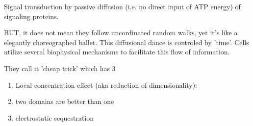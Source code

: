 \begin{mdframed}
Signal transduction by passive diffusion (i.e. no direct input of ATP energy) of
signaling proteins. 

BUT, it does not mean they follow uncordinated random walks, yet it's like a
elegantly choreographed ballet. This diffusional dance is controled by 'time'.
Cells utilize several biophysical mechanisms to facilitate this flow of
information.

They call it 'cheap trick' which has 3
\begin{enumerate}
  \item Local concentration effect (aka reduction of dimensionality):
     

  \item two domains are better than one
  
  \item electrostatic sequestration 
\end{enumerate}
\citep{McLaughlin2002}
\end{mdframed}


